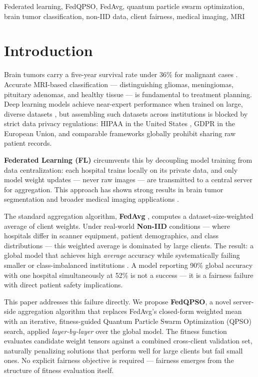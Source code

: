 \documentclass[conference]{IEEEtran}
\begin{document}
\begin{IEEEkeywords}
Federated learning, FedQPSO, FedAvg, quantum particle swarm optimization,
brain tumor classification, non-IID data, client fairness, medical imaging, MRI
\end{IEEEkeywords}

\section{Introduction}
\label{sec:intro}

Brain tumors carry a five-year survival rate under 36\% for malignant cases
\cite{ostrom2021}. Accurate MRI-based classification — distinguishing gliomas,
meningiomas, pituitary adenomas, and healthy tissue — is fundamental to
treatment planning. Deep learning models achieve near-expert performance when
trained on large, diverse datasets \cite{sultan2019}, but assembling such
datasets across institutions is blocked by strict data privacy regulations:
HIPAA in the United States \cite{hipaa}, GDPR in the European Union, and
comparable frameworks globally prohibit sharing raw patient records.

\textbf{Federated Learning (FL)} \cite{mcmahan2017} circumvents this by
decoupling model training from data centralization: each hospital trains
locally on its private data, and only model weight updates — never raw images
— are transmitted to a central server for aggregation. This approach has
shown strong results in brain tumor segmentation \cite{sheller2018} and
broader medical imaging applications \cite{rieke2020}.

The standard aggregation algorithm, \textbf{FedAvg} \cite{mcmahan2017},
computes a dataset-size-weighted average of client weights. Under real-world
\textbf{Non-IID} conditions — where hospitals differ in scanner equipment,
patient demographics, and class distributions — this weighted average is
dominated by large clients. The result: a global model that achieves high
\emph{average} accuracy while systematically failing smaller or
class-imbalanced institutions \cite{zhao2018}. A model reporting 90\% global
accuracy with one hospital simultaneously at 52\% is not a success — it is a
fairness failure with direct patient safety implications.

This paper addresses this failure directly. We propose \textbf{FedQPSO}, a
novel server-side aggregation algorithm that replaces FedAvg's closed-form
weighted mean with an iterative, fitness-guided Quantum Particle Swarm
Optimization (QPSO) \cite{sun2004qpso} search, applied \emph{layer-by-layer}
over the global model. The fitness function evaluates candidate weight
tensors against a combined cross-client validation set, naturally penalizing
solutions that perform well for large clients but fail small ones. No explicit
fairness objective is required — fairness emerges from the structure of
fitness evaluation itself.
\end{document}
